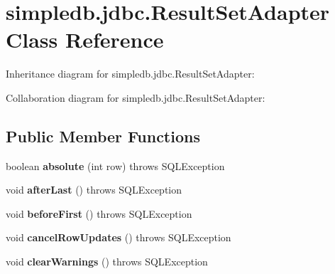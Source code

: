 \hypertarget{classsimpledb_1_1jdbc_1_1ResultSetAdapter}{}\section{simpledb.\+jdbc.\+Result\+Set\+Adapter Class Reference}
\label{classsimpledb_1_1jdbc_1_1ResultSetAdapter}


Inheritance diagram for simpledb.\+jdbc.\+Result\+Set\+Adapter\+:


Collaboration diagram for simpledb.\+jdbc.\+Result\+Set\+Adapter\+:
\subsection*{Public Member Functions}
\begin{DoxyCompactItemize}
\item 
\mbox{\label{classsimpledb_1_1jdbc_1_1ResultSetAdapter_a92ee8d968a38d26997442fe4b49c2c47}} 
boolean {\bfseries absolute} (int row)  throws S\+Q\+L\+Exception 
\item 
\mbox{\label{classsimpledb_1_1jdbc_1_1ResultSetAdapter_aed76da2007bcc240ffffdb5de4da14ef}} 
void {\bfseries after\+Last} ()  throws S\+Q\+L\+Exception 
\item 
\mbox{\label{classsimpledb_1_1jdbc_1_1ResultSetAdapter_a9f6dd46eeaa97ff5f3abb15a0f51630b}} 
void {\bfseries before\+First} ()  throws S\+Q\+L\+Exception 
\item 
\mbox{\label{classsimpledb_1_1jdbc_1_1ResultSetAdapter_a443aad7bae1f382fb33a7c2e7909e850}} 
void {\bfseries cancel\+Row\+Updates} ()  throws S\+Q\+L\+Exception 
\item 
\mbox{\label{classsimpledb_1_1jdbc_1_1ResultSetAdapter_a176f562e25a9a31a1eb404866c92900f}} 
void {\bfseries clear\+Warnings} ()  throws S\+Q\+L\+Exception 
\item 
\mbox{\label{classsimpledb_1_1jdbc_1_1ResultSetAdapter_a3ed9943b3a4624c0e0b2a03415cbae6c}} 

\end{DoxyCompactItemize}
